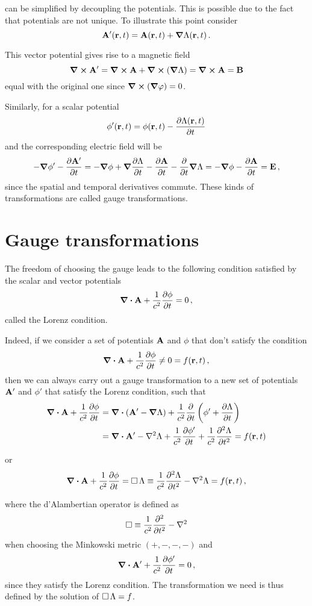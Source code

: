 \documentclass[12pt, class=report, crop=false]{standalone}
\begin{document}
can be simplified by decoupling the potentials. This is possible due to the fact
that potentials are not unique. To illustrate this point consider
\[
  \vb{A}'(\vb{r},t) = \vb{A}(\vb{r},t) + \grad{\Lambda}(\vb{r},t)\,.
\]

This vector potential gives rise to a magnetic field
\[
  \curl{\vb{A}'} = \curl{\vb{A}} + \curl(\grad{\Lambda}) = \curl{\vb{A}} = \vb{B}
\]
equal with the original one since \( \curl(\grad{\varphi}) = 0 \).

Similarly, for a scalar potential
\[
  \phi'(\vb{r},t) = \phi(\vb{r},t) - \pdv{\Lambda(\vb{r},t)}{t}
\]
and the corresponding electric field will be
\[
  - \grad{\phi'} - \pdv{\vb{A'}}{t} =
  - \grad{\phi} + \grad{\pdv{\Lambda}{t}} - \pdv{\vb{A}}{t} - \pdv{t} \grad{\Lambda}
  = - \grad{\phi} - \pdv{\vb{A}}{t}
  = \vb{E}\,,
\]
since the spatial and temporal derivatives commute. These kinds of transformations
are called gauge transformations.

\section{Gauge transformations}

The freedom of choosing the gauge leads to the following condition satisfied by
the scalar and vector potentials
\[
  \div{\vb{A}} + \frac{1}{c^2}\pdv{\phi}{t} = 0\,,
\]
called the Lorenz condition.

Indeed, if we consider a set of potentials \(\vb{A}\) and \(\phi\) that
don't satisfy the condition
\[
  \div{\vb{A}} + \frac{1}{c^2}\pdv{\phi}{t} \ne 0 = f(\vb{r},t)\,,
\]
then we can always carry out a gauge transformation to a new set of potentials
\(\vb{A}'\) and \(\phi'\) that satisfy the Lorenz condition, such that
\begin{align*}
  \div{\vb{A}} + \frac{1}{c^2}\pdv{\phi}{t} &= \div(\vb{A}' - \grad{\Lambda})
    + \frac{1}{c^2}\pdv{t} \left( \phi' + \pdv{\Lambda}{t} \right) \\
    &= \div{\vb{A}'} - \laplacian{\Lambda} + \frac{1}{c^2}\pdv{\phi'}{t}
    + \frac{1}{c^2}\pdv[2]{\Lambda}{t}
    = f(\vb{r},t)
\end{align*}

or
\[
  \div{\vb{A}} + \frac{1}{c^2}\pdv{\phi}{t} =
  \dalambert \Lambda \equiv \frac{1}{c^2}\pdv[2]{\Lambda}{t} - \laplacian{\Lambda} = f(\vb{r},t)\,,
\]

where the d'Alambertian operator is defined as
\[
  \dalambert \equiv \frac{1}{c^2}\pdv[2]{t} - \laplacian
\]
when choosing the Minkowski metric \( (+,-,-,-) \) and
\[
  \div{\vb{A'}} + \frac{1}{c^2}\pdv{\phi'}{t} = 0\,,
\]
since they satisfy the Lorenz condition.
The transformation we need is thus defined by the solution of \(\operatorname{\Box} \Lambda = f\).
\end{document}

